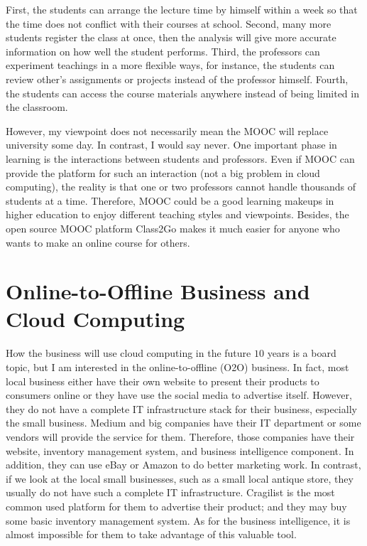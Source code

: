 First, the students can arrange the lecture time by himself within a week so that the time does not conflict with their courses at school. Second, many more students register the class at once, then the analysis will give more accurate information on how well the student performs. Third, the professors can experiment teachings in a more flexible ways, for instance, the students can review other's assignments or projects instead of the professor himself. Fourth, the students can access the course materials anywhere instead of being limited in the classroom.

However, my viewpoint does not necessarily mean the MOOC will replace university some day. In contrast, I would say never. One important phase in learning is the interactions between students and professors. Even if MOOC can provide the platform for such an interaction (not a big problem in cloud computing), the reality is that one or two professors cannot handle thousands of students at a time. Therefore, MOOC could be a good learning makeups in higher education to enjoy different teaching styles and viewpoints. Besides, the open source MOOC platform Class2Go\cite{class2go} makes it much easier for anyone who wants to make an online course for others.

\section{Online-to-Offline Business and Cloud Computing}
How the business will use cloud computing in the future $10$ years is a board topic, but I am interested in the online-to-offline (O2O) business. In fact, most local business either have their own website to present their products to consumers online or they have use the social media to advertise itself. However, they do not have a complete IT infrastructure stack for their business, especially the small business. Medium and big companies have their IT department or some vendors will provide the service for them. Therefore, those companies have their website, inventory management system, and business intelligence component. In addition, they can use eBay or Amazon to do better marketing work. In contrast, if we look at the local small businesses, such as a small local antique store, they usually do not have such a complete IT infrastructure. Cragilist is the most common used platform for them to advertise their product; and they may buy some basic inventory management system. As for the business intelligence, it is almost impossible for them to take advantage of this valuable tool.


